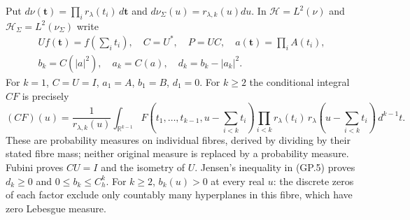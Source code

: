 \documentclass[11pt]{article}
\newcommand{\R}{\mathbb R}
\newcommand{\HH}{\mathcal H}
\begin{document}
Put $d\nu(\mathbf t)=\prod_i r_\lambda(t_i)\,d\mathbf t$ and
$d\nu_\Sigma(u)=r_{\lambda,k}(u)du$. In
$\HH=L^2(\nu)$ and $\HH_\Sigma=L^2(\nu_\Sigma)$ write
\begin{equation}
 \begin{gathered}
 Uf(\mathbf t)=f(\textstyle\sum_i t_i),\quad C=U^*,\quad P=UC,
 \quad a(\mathbf t)=\prod_i A(t_i),\\
 b_k=C(|a|^2),\quad a_k=C(a),\quad d_k=b_k-|a_k|^2.
 \end{gathered}
 \tag{GP.4}
\end{equation}
For $k=1$, $C=U=I$, $a_1=A$, $b_1=B$, $d_1=0$. For $k\geq2$
the conditional integral $CF$ is precisely
\begin{equation}
 (CF)(u)=\frac{1}{r_{\lambda,k}(u)}
 \int_{\R^{k-1}}F(t_1,\ldots,t_{k-1},u-\textstyle\sum_{i<k}t_i)
 \prod_{i<k}r_\lambda(t_i)\,r_\lambda(u-\textstyle\sum_{i<k}t_i)
 \,d^{k-1}t.
 \tag{GP.5}
\end{equation}
These are probability measures on individual fibres, derived by dividing
by their stated fibre mass; neither original measure is replaced by a
probability measure. Fubini proves $CU=I$ and the isometry of $U$.
Jensen's inequality in (GP.5) proves $d_k\geq0$ and
$0\leq b_k\leq C_h^k$. For $k\geq2$, $b_k(u)>0$ at every real $u$:
the discrete zeros of each factor exclude only countably many
hyperplanes in this fibre, which have zero Lebesgue measure.
\end{document}
